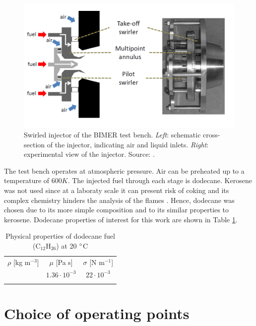 \begin{figure}[h!]
	\centering
	\includegraphics[scale=0.7]{./part3_applications/figures_ch7_aero/BIMER_swirler}
	\caption{Swirled injector of the BIMER test bench. \textsl{Left}: schematic cross-section of the injector, indicating air and liquid inlets. \textsl{Right}: experimental view of the injector. Source: .}
	\label{fig:BIMER_swirler}
\end{figure}

The test bench operates at atmospheric pressure. Air can be preheated up to a temperature of $600 K$. The injected fuel through each stage is dodecane. Kerosene was not used since at a laboraty scale it can present risk of coking and its complex chemistry hinders the analysis of the flames . Hence, dodecane was chosen due to its more simple composition and to its similar properties to kerosene. Dodecane properties of interest for this work are shown in Table \ref{tab:dodecane_properties}.

\begin{table}[!h]
\centering
\caption{Physical properties of dodecane fuel (C$_{12}$H$_26$) at 20 $\degree$C}
\begin{tabular}{ccc}
\thickhline
$\rho$ [kg m$^{-3}$]   & $\mu$ [Pa s]   & $\sigma$ [N m$^{-1}$]  \\
\thickhline
750 & $1.36 \cdot 10^{-3}$ & $22 \cdot 10^{-3}$ \\
\thickhline
\end{tabular}
\label{tab:dodecane_properties}
\end{table}


\section{Choice of operating points}

